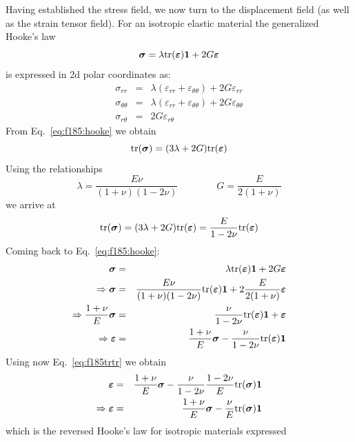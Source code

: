 Having established the stress field, we now turn to the displacement field (as well as 
the strain tensor field).
For an isotropic elastic material 
the generalized Hooke's law 
\begin{equation}
{\bm \sigma}=\lambda {\rm tr}({\bm \varepsilon}) {\bm 1} + 2 G {\bm \varepsilon} 
\label{eq:f185:hooke}
\end{equation} 
is expressed in 2d polar coordinates as:
\begin{eqnarray}
\sigma_{rr}&=& \lambda(\varepsilon_{rr}+\varepsilon_{\theta\theta}) +2G\varepsilon_{rr}\\
\sigma_{\theta\theta}
&=& \lambda(\varepsilon_{rr}+\varepsilon_{\theta\theta}) +2G\varepsilon_{\theta\theta}\\
\sigma_{r\theta} &=& 2G\varepsilon_{r \theta} 
\end{eqnarray}
From Eq.~\eqref{eq:f185:hooke} we obtain
\[
{\rm tr}({\bm \sigma})= (3\lambda+2G) {\rm tr}({\bm \varepsilon})
\]
Using the relationships
\[
\lambda=\frac{E \nu}{(1+\nu)(1-2\nu)} 
\qquad\qquad
G = \frac{E}{2(1+\nu)}
\]
we arrive at 
\begin{equation}
{\rm tr}({\bm \sigma})= (3\lambda+2G) {\rm tr}({\bm \varepsilon}) 
= \frac{E}{1-2\nu} {\rm tr}({\bm \varepsilon}) \label{eq:f185trtr}
\end{equation}
Coming back to Eq.~\eqref{eq:f185:hooke}:
\begin{eqnarray}
{\bm \sigma} &=&\lambda {\rm tr}({\bm \varepsilon}) {\bm 1} + 2 G {\bm \varepsilon} 
\nonumber\\
\Rightarrow
{\bm \sigma} &=& \frac{E \nu}{(1+\nu)(1-2\nu)}  {\rm tr}({\bm \varepsilon}) {\bm 1} 
+ 2 \frac{E}{2(1+\nu)} {\bm \varepsilon} 
\nonumber\\
\Rightarrow
\frac{1+\nu}{E}{\bm \sigma} &=& \frac{\nu}{1-2\nu}  {\rm tr}({\bm \varepsilon}) {\bm 1} 
+  {\bm \varepsilon} 
\nonumber\\
\Rightarrow
{\bm \varepsilon} 
&=& \frac{1+\nu}{E}{\bm \sigma}  - \frac{\nu}{1-2\nu}  {\rm tr}({\bm \varepsilon}) {\bm 1}
\end{eqnarray}
Using now Eq.~\eqref{eq:f185trtr} we obtain
\begin{eqnarray}
{\bm \varepsilon} 
&=& \frac{1+\nu}{E}{\bm \sigma}  - \frac{\nu}{1-2\nu}   \frac{1-2\nu}{E} {\rm tr}({\bm \sigma}) {\bm 1}
\nonumber\\
\Rightarrow
{\bm \varepsilon} 
&=& \frac{1+\nu}{E}{\bm \sigma}  - \frac{\nu}{E} {\rm tr}({\bm \sigma}) {\bm 1}
\end{eqnarray}
which is the reversed Hooke's law for isotropic materials expressed 

